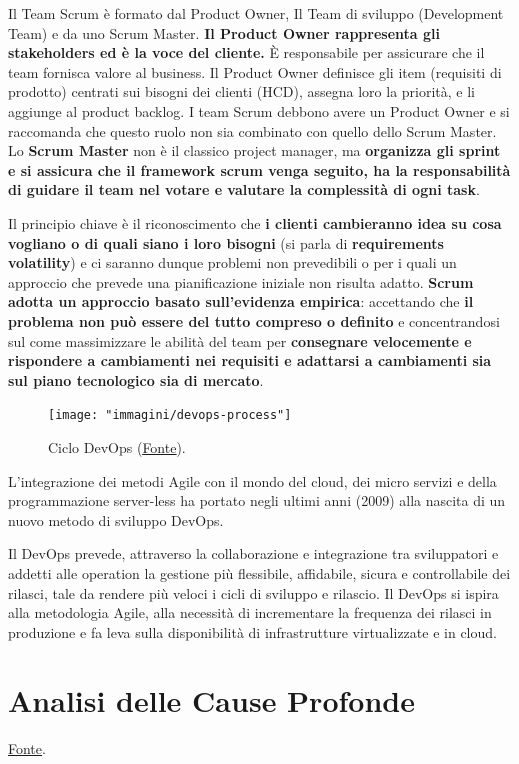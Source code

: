 Il Team Scrum è formato dal Product Owner, Il Team di sviluppo (Development Team) e da uno Scrum Master.
\textbf{Il Product Owner rappresenta gli stakeholders ed è la voce del cliente.} È responsabile per assicurare che il team fornisca valore al business.
Il Product Owner definisce gli item (requisiti di prodotto) centrati sui bisogni dei clienti (HCD), assegna loro la priorità, e li
aggiunge al product backlog. I team Scrum debbono avere un Product Owner e si raccomanda che questo ruolo non sia combinato con quello dello
Scrum Master.
Lo \textbf{Scrum Master} non è il classico project manager, ma \textbf{organizza gli sprint e si assicura che il framework scrum venga seguito, ha
la responsabilità di guidare il team nel votare e valutare la complessità di ogni task}.

Il principio chiave è il riconoscimento che \textbf{i clienti cambieranno idea su cosa vogliano o di quali siano i loro bisogni} (si parla di
\textbf{requirements volatility}) e ci saranno dunque problemi non prevedibili o per i quali un approccio che prevede una pianificazione iniziale
non risulta adatto. \textbf{Scrum adotta un approccio basato sull'evidenza empirica}: accettando che \textbf{il problema non può essere del tutto
compreso o definito} e concentrandosi sul come massimizzare le abilità del team per \textbf{consegnare velocemente e rispondere a cambiamenti nei
requisiti e adattarsi a cambiamenti sia sul piano tecnologico sia di mercato}.

\begin{figure}[h!]
	\centering
	\texttt{[image: "immagini/devops-process"]}
	\caption{Ciclo DevOps (\href{https://italiancoders.it/introduzione-al-devops/}{\underline{Fonte}}).}
\end{figure}

L'integrazione dei metodi Agile con il mondo del cloud, dei micro servizi e della programmazione server-less ha portato negli ultimi anni (2009)
alla nascita di un nuovo metodo di sviluppo DevOps.

Il DevOps prevede, attraverso la collaborazione e integrazione tra sviluppatori e addetti alle operation la gestione più flessibile, affidabile,
sicura e controllabile dei rilasci, tale da rendere più veloci i cicli di sviluppo e rilascio. Il DevOps si ispira alla metodologia Agile, alla
necessità di incrementare la frequenza dei rilasci in produzione e fa leva sulla disponibilità di infrastrutture virtualizzate e in cloud.

\section{Analisi delle Cause Profonde}
\begin{flushleft}
	\href{https://www.tableau.com/it-it/learn/articles/root-cause-analysis}{\underline{Fonte}}.
\end{flushleft}

